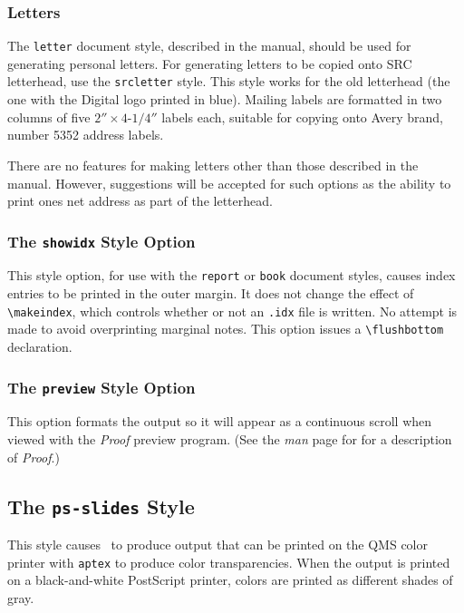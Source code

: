  
\subsubsection{Letters} \label{sec:letters}
 
The \mbox{\tt letter} document style, described in the manual, should
be used for generating personal letters.  For generating letters to be
copied onto SRC letterhead, use the \mbox{\tt srcletter} style.  This
style works for the old letterhead (the one with the Digital logo
printed in blue).  Mailing labels are formatted in two columns of five
$2''\times\mbox{4-1/4}''$ labels each, suitable for copying onto Avery
brand, number 5352 address labels.
 
There are no features for making letters other than those described in
the manual.  However, suggestions will be accepted for such options as
the ability to print ones net address as part of the letterhead.
 
\subsubsection{The {\tt showidx} Style Option}
 
This style option, for use with the {\tt report} or {\tt book} document
styles, causes index entries to be printed in the outer margin.  It
does not change the effect of \verb|\makeindex|, which controls
whether or not an {\tt .idx} file is written.  No attempt is made to
avoid overprinting marginal notes.  This option issues a 
\verb|\flushbottom| declaration.
 
 
\subsubsection{The {\tt preview} Style Option}
 
This option formats the output so it will appear as a continuous scroll
when viewed with the {\em Proof\/} preview program.  (See the {\em man\/}
page for for a description of {\em Proof}.)
 
\subsection{The {\tt ps-slides} Style} \label{sec:ps-slides}
 
This style causes \SLiTeX\ to produce output that can be printed on the
QMS color printer with {\tt aptex} to produce color transparencies.
When the output is printed on a black-and-white PostScript printer,
colors are printed as different shades of gray.
 
